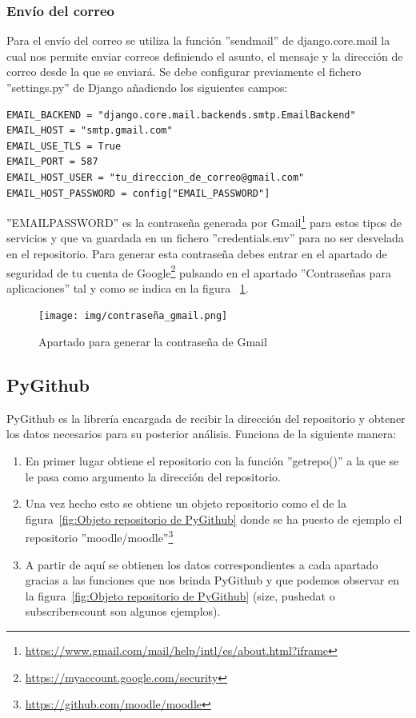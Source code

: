 \documentclass[a4paper, 12pt]{book}
\begin{document}
\subsubsection{Envío del correo}

Para el envío del correo se utiliza la función ''send\textunderscore mail'' de django.core.mail la cual nos permite enviar correos definiendo el asunto, el mensaje y la dirección de correo desde la que se enviará. Se debe configurar previamente el fichero ''settings.py'' de Django añadiendo los siguientes campos:

\begin{verbatim}
EMAIL_BACKEND = "django.core.mail.backends.smtp.EmailBackend"
EMAIL_HOST = "smtp.gmail.com"
EMAIL_USE_TLS = True
EMAIL_PORT = 587
EMAIL_HOST_USER = "tu_direccion_de_correo@gmail.com"
EMAIL_HOST_PASSWORD = config["EMAIL_PASSWORD"]
\end{verbatim}

''EMAIL\textunderscore PASSWORD'' es la contraseña generada por Gmail\footnote{\url{https://www.gmail.com/mail/help/intl/es/about.html?iframe}} para estos tipos de servicios y que va guardada en un fichero ''credentials.env'' para no ser desvelada en el repositorio. Para generar esta contraseña debes entrar en el apartado de seguridad de tu cuenta de Google\footnote{\url{https://myaccount.google.com/security}} pulsando en el apartado ''Contraseñas para aplicaciones'' tal y como se indica en la figura ~\ref{fig:contraseña gmail}.

\begin{figure}
    \centering
    \texttt{[image: img/contraseña\_gmail.png]}
    \caption{Apartado para generar la contraseña de Gmail}\label{fig:contraseña gmail}
\end{figure}

\subsection{PyGithub}

PyGithub es la librería encargada de recibir la dirección del repositorio y obtener los datos necesarios para su posterior análisis. Funciona de la siguiente manera:

\begin{enumerate}
	\item En primer lugar obtiene el repositorio con la función ''get\textunderscore repo()'' a la que se le pasa como argumento la dirección del repositorio.
	\item Una vez hecho esto se obtiene un objeto repositorio como el de la figura~\ref{fig:Objeto repositorio de PyGithub} donde se ha puesto de ejemplo el repositorio ''moodle/moodle''\footnote{\url{https://github.com/moodle/moodle}}
	\item A partir de aquí se obtienen los datos correspondientes a cada apartado gracias a las funciones que nos brinda PyGithub y que podemos observar en la figura~\ref{fig:Objeto repositorio de PyGithub} (size, pushed\textunderscore at o subscribers\textunderscore count son algunos ejemplos). 
\end{enumerate}
\end{document}
